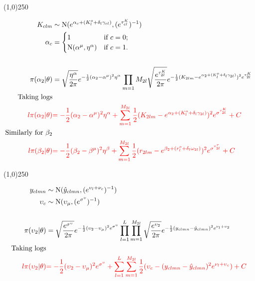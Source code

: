 \begin{center}
\line(1,0){250}
\end{center}

\begin{align*}
K_{clm} &\sim \operatorname{N}(e^{\alpha_{c}+(K_{l}^o+\delta_{l}\gamma_{cl})},(e^{ \tau_{cl}^K })^{-1})\\
\alpha_{c}&=\begin{cases}
1  & \text{if } c=0;\\
\operatorname{N}(\alpha^{\mu},\eta^{\alpha})  & \text{if } c=1.
\end{cases}\\
\\
\pi(\alpha_{2}|\theta)&=
\sqrt{\frac{\eta^{\alpha}}{2\pi}} e^{-\frac{1}{2}(\alpha_{2}-\alpha^{\mu})^{2}\eta^{\alpha} }
\prod_{m=1}{M_{2l}}
\sqrt{\frac{e^{ \tau_{2l}^K }}{2\pi}} e^{-\frac{1}{2}(K_{2lm}-e^{\alpha_{2}+(K_{l}^o+\delta_{l}\gamma_{2l})})^{2}e^{ \tau_{2l}^K } }\\
\text{Taking logs}\\
\color{red}{l\pi(\alpha_{2}|\theta)}&
\color{red}{
=-\frac{1}{2}(\alpha_{2}-\alpha^{\mu})^{2}\eta^{\alpha}  
+
\sum_{m=1}^{M_{2l}}\frac{1}{2}(K_{2lm}-e^{\alpha_{2}+(K_{l}^o+\delta_{l}\gamma_{2l})})^{2}e^{\sigma^{\tau_{2l}^K}}
+C
}\\
\text{Similarly for $\beta_{2}$}\\
\color{red}{l\pi(\beta_{2}|\theta)}&
\color{red}{
=-\frac{1}{2}(\beta_{2}-\beta^{\mu})^{2}\eta^{\beta}  
+
\sum_{m=1}^{M_{2l}}\frac{1}{2}(r_{2lm}-e^{\beta_{2}+(r_{l}^o+\delta_{l}\omega_{2l})})^{2}e^{\sigma^{\tau_{2l}^r}}
+C
}
\end{align*}


\begin{center}
\line(1,0){250}
\end{center}


\begin{align*}
y_{clmn} &\sim \operatorname{N}(\hat{y}_{clmn},(e^{ \upsilon_{l}+\nu_{c}  })^{-1} ) \\
\upsilon_{c} &\sim \operatorname{N}(\upsilon_{\mu},(e^{ \sigma^{\upsilon} })^{-1})\\
\\
\pi(\upsilon_{2}|\theta)&=\sqrt{\frac{e^{ \sigma^{\upsilon} }}{2\pi}} e^{-\frac{1}{2}(\upsilon_{2}-\upsilon_{\mu})^{2}e^{ \sigma^{\upsilon} } }
\prod_{l=1}^{L}\prod_{m=1}^{M_{2l}}\sqrt{\frac{e^{ \upsilon_{2} }}{2\pi}} e^{-\frac{1}{2}(y_{clmn}-\hat{y}_{clmn})^{2}e^{ \nu_{l} +\upsilon_{2} } }\\
\text{Taking logs}\\
\color{red}{l\pi(\upsilon_{2}|\theta)}&
\color{red}{
=-\frac{1}{2}(\upsilon_{2}-\upsilon_{\mu})^{2}e^{ \sigma^{\upsilon} } 
+
\sum_{l=1}^{L}\sum_{m=1}^{M_{2l}}\frac{1}{2}(\upsilon_{c}-(y_{clmn}-\hat{y}_{clmn})^{2}e^{\nu_{l}+\upsilon_{c} })
+C}
\end{align*}